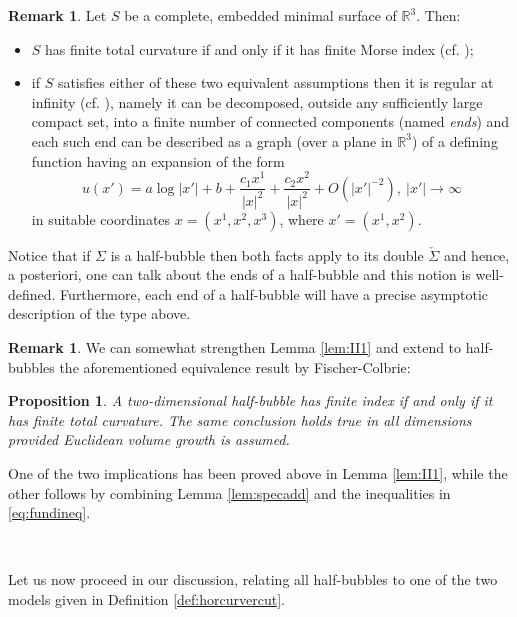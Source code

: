 \documentclass[10pt]{article}
\newtheorem{prop}[thm]{Proposition}
\theoremstyle{definition}\newtheorem{definition}[thm]{Definition}
\newtheorem{rmk}[thm]{Remark}
\numberwithin{equation}{section}
\newcommand{\R}{\mathbb{R}}\newcommand{\C}{\mathbb{C}}\newcommand{\N}{\mathbb{N}}
\begin{document}
        	\begin{rmk}\label{rem:reginf}
        		Let $S$ be a complete, embedded minimal surface of $\R^3$. Then:
        		\begin{itemize}
        			\item{$S$ has finite total curvature if and only if it has finite Morse index (cf. \cite{FC85});}
        			\item{if $S$ satisfies either of these two equivalent assumptions then it is regular at infinity (cf. \cite{Sc83}), namely it can be decomposed, outside any sufficiently large compact set, into a finite number of connected components (named \textsl{ends}) and each such end can be described as a graph (over a plane in $\R^3$) of a defining function having an expansion of the form
        				\[
        				u(x')=a\log|x'|+b+\frac{c_1 x^1}{|x|^2}+\frac{c_2 x^2}{|x|^2}+O(|x'|^{-2}), \ |x'|\longrightarrow\infty
        				\]
        				in suitable coordinates $x=(x^1,x^2,x^3)$, where $x'=(x^1,x^2)$.
        			}
        		\end{itemize}
        		Notice that if $\Sigma$ is a half-bubble then both facts apply to its double $\check{\Sigma}$ and hence, a posteriori, one can talk about the ends of a half-bubble and this notion is well-defined. Furthermore, each end of a half-bubble will have a precise asymptotic description of the type above.
        	\end{rmk}
        	
        		\begin{rmk}
        			We can somewhat strengthen Lemma \ref{lem:II1} and extend to half-bubbles the aforementioned equivalence result by Fischer-Colbrie:
        			\end{rmk}
        		\begin{prop}\label{pro:equiv}
        			A two-dimensional half-bubble has finite index if and only if it has finite total curvature.	The same conclusion holds true in all dimensions provided Euclidean volume growth is assumed.
        		\end{prop}
        		One of the two implications has been proved above in Lemma \ref{lem:II1}, while the other follows by combining Lemma \ref{lem:specadd} and the inequalities in \eqref{eq:fundineq}.
        	
        	\
        	
        	Let us now proceed in our discussion, relating all half-bubbles to one of the two models given in Definition \ref{def:horcurvercut}.
        	
\end{document}
